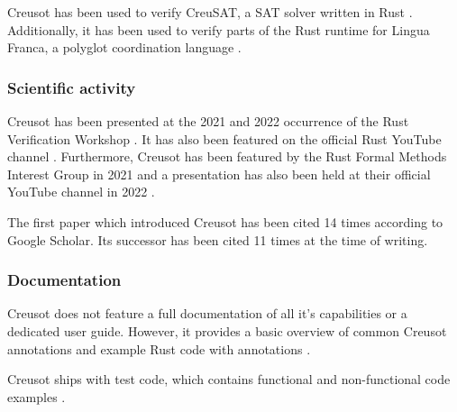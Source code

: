 Creusot has been used to verify CreuSAT, a SAT solver written in Rust \cite{skotam_creusat_2022}. Additionally, it has been used to verify parts of the Rust runtime for Lingua Franca, a polyglot coordination language \cite{johannes_hayes_verifying_2023}.

\subsubsection{Scientific activity}
Creusot has been presented at the 2021 and 2022 occurrence of the Rust Verification Workshop \cite{peter_muller_rust_2021,peter_muller_rust_2022}. It has also been featured on the official Rust YouTube channel \cite{rust_creusot_2021}. Furthermore, Creusot has been featured by the Rust Formal Methods Interest Group in 2021 \cite{rust_formal_methods_interest_group_tools_2021} and a presentation has also been held at their official YouTube channel in 2022 \cite{rust_formal_methods_ig_february_2022}.

The first paper \cite{denis_creusot_2021} which introduced Creusot has been cited 14 times according to Google Scholar. Its successor \cite{riesco_creusot_2022} has been cited 11 times at the time of writing.

\subsubsection{Documentation}
Creusot does not feature a full documentation of all it's capabilities or a dedicated user guide. However, it provides a basic overview of common Creusot annotations and example Rust code with annotations \cite{xavier_denis_xldeniscreusot_2023}. 

Creusot ships with test code, which contains functional and non-functional code examples \cite{xavier_denis_creusotcreusottests_2023}. 

